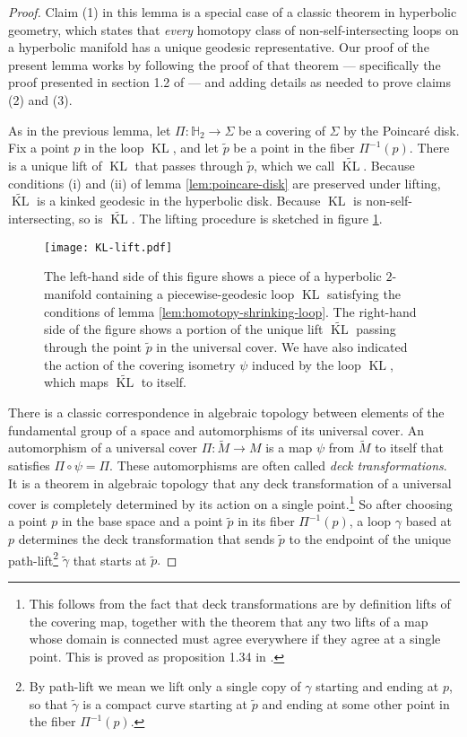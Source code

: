 \documentclass[a4paper,11pt]{article}
\renewcommand{\tilde}{\widetilde}
\newcommand{\KL}{\operatorname{KL}}
\begin{document}
\begin{proof}
    Claim (1) in this lemma is a special case of a classic theorem in hyperbolic geometry, which states that \emph{every} homotopy class of non-self-intersecting loops on a hyperbolic manifold has a unique geodesic representative. Our proof of the present lemma works by following the proof of that theorem --- specifically the proof presented in section 1.2 of \cite{farb2011primer} --- and adding details as needed to prove claims (2) and (3).
    
    As in the previous lemma, let $\Pi : \mathbb{H}_{2} \rightarrow \Sigma$ be a covering of $\Sigma$ by the Poincar\'{e} disk. Fix a point $p$ in the loop $\KL$, and let $\tilde{p}$ be a point in the fiber $\Pi^{-1}(p).$ There is a unique lift of $\KL$ that passes through $\tilde{p}$, which we call $\tilde{\KL}$. Because conditions (i) and (ii) of lemma \ref{lem:poincare-disk} are preserved under lifting, $\tilde{\KL}$ is a kinked geodesic in the hyperbolic disk. Because $\KL$ is non-self-intersecting, so is $\tilde{\KL}.$ The lifting procedure is sketched in figure \ref{fig:KL-lift}.
    
    \begin{figure}
        \centering
        \texttt{[image: KL-lift.pdf]}
        \caption{The left-hand side of this figure shows a piece of a hyperbolic $2$-manifold containing a piecewise-geodesic loop $\KL$ satisfying the conditions of lemma \ref{lem:homotopy-shrinking-loop}. The right-hand side of the figure shows a portion of the unique lift $\tilde{\KL}$ passing through the point $\tilde{p}$ in the universal cover. We have also indicated the action of the covering isometry $\psi$ induced by the loop $\KL$, which maps $\tilde{\KL}$ to itself.}
        \label{fig:KL-lift}
    \end{figure}
    
    There is a classic correspondence in algebraic topology between elements of the fundamental group of a space and automorphisms of its universal cover. An automorphism of a universal cover $\Pi : \tilde{M} \rightarrow M$ is a map $\psi$ from $\tilde{M}$ to itself that satisfies $\Pi \circ \psi = \Pi.$ These automorphisms are often called \emph{deck transformations}. It is a theorem in algebraic topology that any deck transformation of a universal cover is completely determined by its action on a single point.\footnote{This follows from the fact that deck transformations are by definition lifts of the covering map, together with the theorem that any two lifts of a map whose domain is connected must agree everywhere if they agree at a single point. This is proved as proposition 1.34 in \cite{hatcher2001algebraic}.} So after choosing a point $p$ in the base space and a point $\tilde{p}$ in its fiber $\Pi^{-1}(p)$, a loop $\gamma$ based at $p$ determines the deck transformation that sends $\tilde{p}$ to the endpoint of the unique path-lift\footnote{By path-lift we mean we lift only a single copy of $\gamma$ starting and ending at $p$, so that $\tilde{\gamma}$ is a compact curve starting at $\tilde{p}$ and ending at some other point in the fiber $\Pi^{-1}(p)$.} $\tilde{\gamma}$ that starts at $\tilde{p}.$
    

\end{proof}
\end{document}
